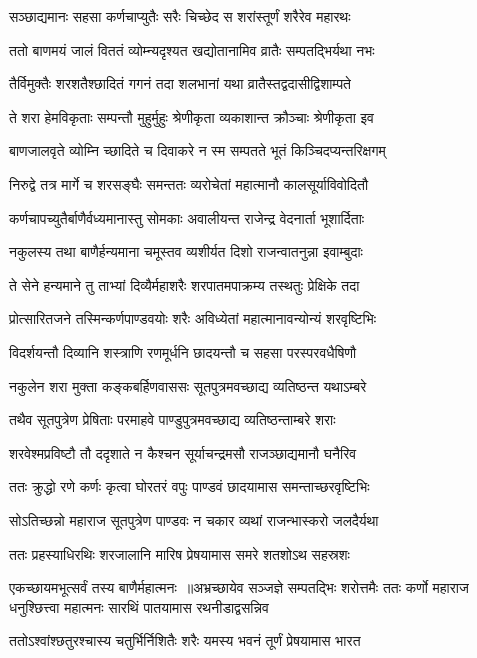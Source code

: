 \twolineshloka
{सञ्छाद्यमानः सहसा कर्णचाप्युतैः सरैः}
{चिच्छेद स शरांस्तूर्णं शरैरेव महारथः}


\twolineshloka
{ततो बाणमयं जालं विततं व्योम्न्यदृश्यत}
{खद्योतानामिव व्रातैः सम्पतद्भिर्यथा नभः}


\twolineshloka
{तैर्विमुक्तैः शरशतैश्छादितं गगनं तदा}
{शलभानां यथा व्रातैस्तद्वदासीद्विशाम्पते}


\twolineshloka
{ते शरा हेमविकृताः सम्पन्तौ मुहुर्मुहुः}
{श्रेणीकृता व्यकाशान्त क्रौञ्चाः श्रेणीकृता इव}


\twolineshloka
{बाणजालवृते व्योम्नि च्छादिते च दिवाकरे}
{न स्म सम्पतते भूतं किञ्चिदप्यन्तरिक्षगम्}


\twolineshloka
{निरुद्वे तत्र मार्गे च शरसङ्घैः समन्ततः}
{व्यरोचेतां महात्मानौ कालसूर्याविवोदितौ}


\twolineshloka
{कर्णचापच्युतैर्बाणैर्वध्यमानास्तु सोमकाः}
{अवालीयन्त राजेन्द्र वेदनार्ता भूशार्दिताः}


\twolineshloka
{नकुलस्य तथा बाणैर्हन्यमाना चमूस्तव}
{व्यशीर्यत दिशो राजन्वातनुन्ना इवाम्बुदाः}


\twolineshloka
{ते सेने हन्यमाने तु ताभ्यां दिव्यैर्महाशरैः}
{शरपातमपाक्रम्य तस्थतुः प्रेक्षिके तदा}


\twolineshloka
{प्रोत्सारितजने तस्मिन्कर्णपाण्डवयोः शरैः}
{अविध्येतां महात्मानावन्योन्यं शरवृष्टिभिः}


\twolineshloka
{विदर्शयन्तौ दिव्यानि शस्त्राणि रणमूर्धनि}
{छादयन्तौ च सहसा परस्परवधैषिणौ}


\twolineshloka
{नकुलेन शरा मुक्ता कङ्कबर्हिणवाससः}
{सूतपुत्रमवच्छाद्य व्यतिष्ठन्त यथाऽम्बरे}


\twolineshloka
{तथैव सूतपुत्रेण प्रेषिताः परमाहवे}
{पाण्डुपुत्रमवच्छाद्य व्यतिष्ठन्ताम्बरे शराः}


\twolineshloka
{शरवेश्मप्रविष्टौ तौ ददृशाते न कैश्चन}
{सूर्याचन्द्रमसौ राजञ्छाद्यमानौ घनैरिव}


\twolineshloka
{ततः क्रुद्धो रणे कर्णः कृत्वा घोरतरं वपुः}
{पाण्डवं छादयामास समन्ताच्छरवृष्टिभिः}


\twolineshloka
{सोऽतिच्छन्नो महाराज सूतपुत्रेण पाण्डवः}
{न चकार व्यथां राजन्भास्करो जलदैर्यथा}


\twolineshloka
{ततः प्रहस्याधिरथिः शरजालानि मारिष}
{प्रेषयामास समरे शतशोऽथ सहस्रशः}


एकच्छायमभूत्सर्वं तस्य बाणैर्महात्मनः ॥अभ्रच्छायेव सञ्जज्ञे सम्पतद्भिः शरोत्तमैः
\twolineshloka
{ततः कर्णो महाराज धनुश्छित्त्वा महात्मनः}
{सारथिं पातयामास रथनीडाद्वसन्निव}


\twolineshloka
{ततोऽश्वांश्छतुरश्चास्य चतुर्भिर्निशितैः शरैः}
{यमस्य भवनं तूर्णं प्रेषयामास भारत}


